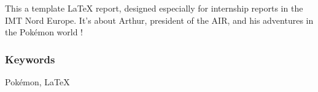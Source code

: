 \documentclass[../main.tex]{subfiles}
\begin{document}
This a template LaTeX report, designed especially for internship reports in the IMT Nord Europe. It's about Arthur, president of the AIR, and his adventures in the Pokémon world !\\

\subsubsection{Keywords}
Pokémon, LaTeX
\end{document}

